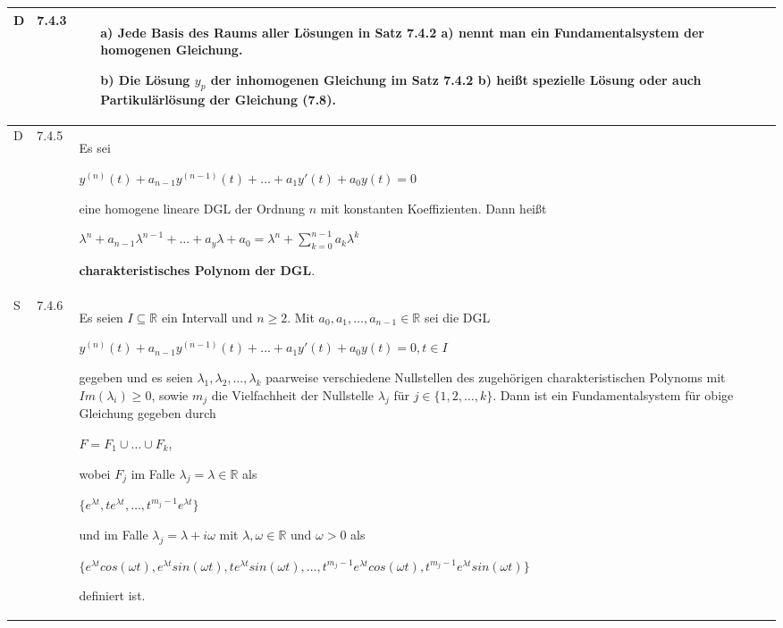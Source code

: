 \begin{longtable}{p{0.75cm} p{1cm} p{16cm}}
        D   & 7.4.3 &   \begin{itemize}[topsep=-0.5cm]
                            \item[a)] Jede Basis des Raums aller Lösungen in Satz 7.4.2 a) nennt man ein Fundamentalsystem der homogenen Gleichung.
                            \item[b)] Die Lösung $y_p$ der inhomogenen Gleichung im Satz 7.4.2 b) heißt spezielle Lösung oder auch
                                        \textbf{Partikulärlösung der Gleichung (7.8)}.
                        \end{itemize} \vspace{-0cm} \\
        \midrule
        D   & 7.4.5 &   Es sei \hfill \break
                        \centerline{$ y^{(n)}(t) + a_{n-1}y^{(n-1)}(t) + \dots + a_1y'(t)+a_0y(t)=0 $}
                        eine homogene lineare DGL der Ordnung $n$ mit konstanten Koeffizienten. Dann heißt \hfill \break
                        \centerline{$ \lambda^n + a_{n-1}\lambda^{n-1}+ \dots + a_y \lambda+a_0 = \lambda^n + \sum^{n-1}_{k=0} a_k \lambda^k $} 
                        \textbf{charakteristisches Polynom der DGL}. \\
        \midrule
         S   & 7.4.6 &   Es seien $I \subseteq \mathbb{R}$ ein Intervall und $n \geq 2$. Mit $a_0,a_1,\dots,a_{n-1} \in \mathbb{R}$ sei die DGL \hfill \break
                        \centerline{$ y^{(n)}(t) + a_{n-1} y^{(n-1)} (t) + \dots + a_1 y'(t) +a_0y(t) = 0, t\in I$}
                        gegeben und es seien $\lambda_1,\lambda_2,\dots,\lambda_k$ paarweise verschiedene Nullstellen des zugehörigen charakteristischen
                        Polynoms mit $Im(\lambda_i) \geq 0$, sowie $m_j$ die Vielfachheit der Nullstelle $\lambda_j$ für $j \in \{1,2,\dots,k\}$. \hfill \break
                        Dann ist ein Fundamentalsystem für obige Gleichung gegeben durch \hfill \break
                        \centerline{$ F = F_1 \cup \dots \cup F_k $,}
                        wobei $F_j$ im Falle $\lambda_j = \lambda \in \mathbb{R}$ als \hfill \break
                        \centerline{$ \{e^{\lambda t},te^{\lambda t},\dots,t^{m_j-1}e^{\lambda t} \} $}
                        und im Falle $\lambda_j = \lambda + i\omega$ mit $\lambda, \omega\in \mathbb{R}$ und $\omega > 0$ als \hfill \break
                        \centerline{$ \{ e^{\lambda t}cos(\omega t), e^{\lambda t}sin(\omega t), te^{\lambda t}sin(\omega t), \dots,
                        t^{m_j-1}e^{\lambda t}cos(\omega t),  t^{m_j-1}e^{\lambda t}sin(\omega t)\} $}
                        definiert ist. \\
        \bottomrule

    \end{longtable}


